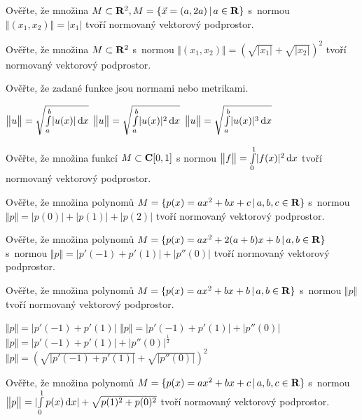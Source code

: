\documentclass[a4paper,10pt]{book}
\def\Real{{\rm\bf R}}
\def\C{{\rm\bf C}}
\def\d{\,{\rm d}}               %
\def\abs#1{\lvert#1\rvert}
\def\norm#1{\bigl\Vert#1\bigr\Vert} %
\def\where{\,|\,}                    %
\newenvironment{tabbedenum}[1]
 {\NumTabs{#1}\inparaenum\let\latexitem\item
  \def\item{\def\item{\tab\latexitem}\latexitem}}
{\endinparaenum}
\begin{document}
\vspace{0.5cm}

\exercise \label{ex:metr1} Ověřte, že množina $M \subset \Real^2, M=\{\vec{x}=(a,2a) \where a\in\Real\}$ s~normou 
  $\norm{(x_1,x_2)}=\abs{x_1}$ tvoří normovaný vektorový podprostor.
  
\exercise \label{ex:metr2} Ověřte, že množina $M \subset \Real^2$ s~normou 
  $\norm{(x_1,x_2)}=\left(\sqrt{\abs{x_1}} + \sqrt{\abs{x_2}}\right)^2$ tvoří normovaný vektorový podprostor.

\exercise \label{ex:norm1} Ověřte, že zadané funkce jsou normami nebo metrikami.

\begin{tabbedenum}{3}
\item $\norm{u}=\sqrt{\int \limits_a^b \abs{u(x)} \d x}$
\item $\norm{u}=\sqrt{\int \limits_a^b \abs{u(x)}^2 \d x}$
\item $\norm{u}=\sqrt{\int \limits_a^b \abs{u(x)}^3 \d x}$
\end{tabbedenum}

\exercise \label{ex:norm2} Ověřte, že množina funkcí $M \subset \C [0,1]$ s normou 
  $\norm{f}=\int \limits_0^1 \abs{f(x)}^2 \d x$ tvoří normovaný vektorový podprostor.

\exercise \label{ex:norm3} Ověřte, že množina polynomů $M = \{p(x)=ax^2+bx+c \where a,b,c \in \Real\}$ s~normou 
  $\norm{p}=\abs{p(0)}+\abs{p(1)}+\abs{p(2)}$ tvoří normovaný vektorový podprostor.

\exercise \label{ex:norm4} Ověřte, že množina polynomů $M = \{p(x)=ax^2+2(a+b)x+b \where a,b \in \Real\}$ s~normou 
  $\norm{p}=\abs{p'(-1)+p'(1)}+\abs{p''(0)}$ tvoří normovaný vektorový podprostor.
  
\exercise \label{ex:norm5} Ověřte, že množina polynomů $M = \{p(x)=ax^2+bx+b \where a,b \in \Real\}$ s~normou 
  $\norm{p}$ tvoří normovaný vektorový podprostor. 
\begin{enumerate}[label=\alph*), itemsep=-3pt, topsep=-7pt]
  \item $\norm{p}=\abs{p'(-1)+p'(1)}$
  \item $\norm{p}=\abs{p'(-1)+p'(1)}+\abs{p''(0)}$
  \item $\norm{p}=\abs{p'(-1)+p'(1)}+\abs{p''(0)}^{\frac{1}{2}}$
  \item $\norm{p}=\left(\sqrt{\abs{p'(-1)+p'(1)}}+\sqrt{\abs{p''(0)}}\right)^2$
\end{enumerate}

\exercise \label{ex:norm6} Ověřte, že množina polynomů $M = \{p(x)=ax^2+bx+c \where a,b,c \in \Real\}$ s~normou 
  $\norm{p}=\abs{\int \limits_0^1 p(x) \d x} + \sqrt{p(1)^2 + p(0)^2}$ tvoří normovaný vektorový podprostor.
\end{document}
